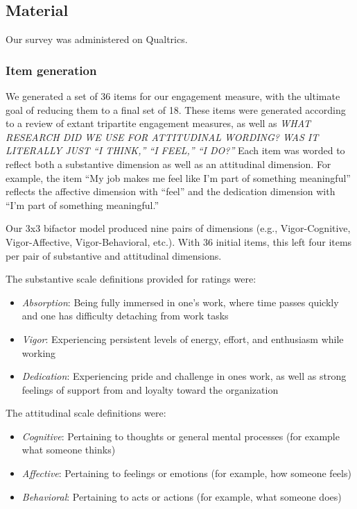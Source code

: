 \documentclass[
  english,
  man]{apa6}
\begin{document}
\hypertarget{material}{%
\subsection{Material}\label{material}}

Our survey was administered on Qualtrics.

\hypertarget{item-generation}{%
\subsubsection{Item generation}\label{item-generation}}

We generated a set of 36 items for our engagement measure, with the ultimate goal of reducing them to a final set of 18. These items were generated according to a review of extant tripartite engagement measures, as well as \emph{WHAT RESEARCH DID WE USE FOR ATTITUDINAL WORDING? WAS IT LITERALLY JUST ``I THINK,'' ``I FEEL,'' ``I DO?''} Each item was worded to reflect both a substantive dimension as well as an attitudinal dimension. For example, the item ``My job makes me feel like I'm part of something meaningful'' reflects the affective dimension with ``feel'' and the dedication dimension with ``I'm part of something meaningful.''

Our 3x3 bifactor model produced nine pairs of dimensions (e.g., Vigor-Cognitive, Vigor-Affective, Vigor-Behavioral, etc.). With 36 initial items, this left four items per pair of substantive and attitudinal dimensions.

The substantive scale definitions provided for ratings were:

\begin{itemize}
\item
  \emph{Absorption}: Being fully immersed in one's work, where time passes quickly and one has difficulty detaching from work tasks
\item
  \emph{Vigor}: Experiencing persistent levels of energy, effort, and enthusiasm while working
\item
  \emph{Dedication}: Experiencing pride and challenge in ones work, as well as strong feelings of support from and loyalty toward the organization
\end{itemize}

The attitudinal scale definitions were:

\begin{itemize}
\item
  \emph{Cognitive}: Pertaining to thoughts or general mental processes (for example what someone thinks)
\item
  \emph{Affective}: Pertaining to feelings or emotions (for example, how someone feels)
\item
  \emph{Behavioral}: Pertaining to acts or actions (for example, what someone does)
\end{itemize}
\end{document}
